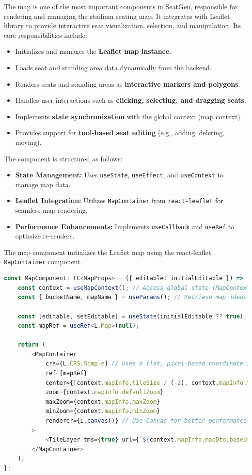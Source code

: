 The map is one of the most important components in SeatGen, responsible for rendering and managing the stadium seating map. It integrates with Leaflet library to provide interactive seat visualization, selection, and manipulation. Its core responsibilities include:

\begin{itemize}
    \item Initializes and manages the \textbf{Leaflet map instance}.
    \item Loads seat and standing area data dynamically from the backend.
    \item Renders seats and standing areas as \textbf{interactive markers and polygons}.
    \item Handles user interactions such as \textbf{clicking, selecting, and dragging seats}.
    \item Implements \textbf{state synchronization} with the global context (map context).
    \item Provides support for \textbf{tool-based seat editing} (e.g., adding, deleting, moving).
\end{itemize}

\newpage

The component is structured as follows:

\begin{itemize}
    \item \textbf{State Management:} Uses \texttt{useState}, \texttt{useEffect}, and \texttt{useContext} to manage map data.
    \item \textbf{Leaflet Integration:} Utilizes \texttt{MapContainer} from \texttt{react-leaflet} for seamless map rendering.
    \item \textbf{Performance Enhancements:} Implements \texttt{useCallback} and \texttt{useRef} to optimize re-renders.
\end{itemize}


The map component initializes the Leaflet map using the react-leaflet \texttt{MapContainer} component.

\begin{lstlisting}[language=TypeScript, caption=Initializing Leaflet Map in React, label=lst:react-leaflet]
const MapComponent: FC<MapProps> = ({ editable: initialEditable }) => {
    const context = useMapContext(); // Access global state (MapContext)
    const { bucketName, mapName } = useParams(); // Retrieve map identifiers from URL params

    const [editable, setEditable] = useState(initialEditable ?? true);
    const mapRef = useRef<L.Map>(null);

    return (
        <MapContainer
            crs={L.CRS.Simple} // Uses a flat, pixel-based coordinate system
            ref={mapRef}
            center={[context.mapInfo.tileSize / (-2), context.mapInfo.tileSize / (2)]}
            zoom={context.mapInfo.defaultZoom}
            maxZoom={context.mapInfo.maxZoom}
            minZoom={context.mapInfo.minZoom}
            renderer={L.canvas()} // Use Canvas for better performance
        >
            <TileLayer tms={true} url={`${context.mapInfo.mapDto.baseUrl}/{z}/{x}/{y}.png`} />
        </MapContainer>
    );
};
\end{lstlisting}

